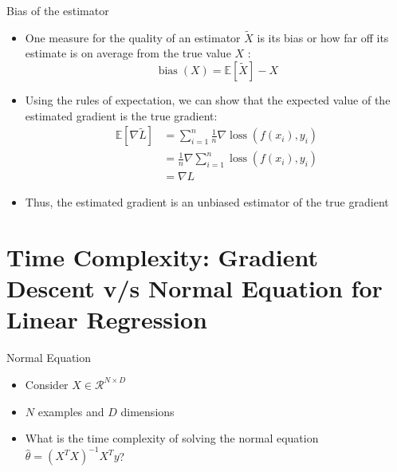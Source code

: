 \documentclass[usenames,dvipsnames]{beamer}
\begin{document}
    \begin{frame}{Bias of the estimator}
        \begin{itemize}[<+->]
            \item One measure for the quality of an estimator $\tilde{X}$ is its bias or how far off its estimate is on average from the true value $X$ :
            $$
            \operatorname{bias}(X)=\mathbb{E}[\tilde{X}]-X
            $$
           
            \item Using the rules of expectation, we can show that the expected value of the estimated gradient is the true gradient:
            $$
            \begin{aligned}
                \mathbb{E}[\nabla \tilde{L}] & =\sum_{i=1}^n \frac{1}{n} \nabla \operatorname{loss}\left(f\left(x_i\right), y_i\right) \\
                & =\frac{1}{n} \nabla \sum_{i=1}^n \operatorname{loss}\left(f\left(x_i\right), y_i\right) \\
                & =\nabla L
                \end{aligned}
                $$
                \item Thus, the estimated gradient is an unbiased estimator of the true gradient
        \end{itemize}
        
    \end{frame}

    {

}
                

  \section{Time Complexity: Gradient Descent v/s Normal Equation for Linear Regression}
  \begin{frame}{Normal Equation}

	\begin{itemize}[<+->]
		\item Consider $X\in \mathcal{R}^{N\times D}$
		\item $N$ examples and $D$ dimensions
		\item What is the time complexity of solving the normal equation $\hat{\theta} = (X^TX)^{-1}X^Ty$?
	\end{itemize}
	
	

\end{frame}
\end{document}
